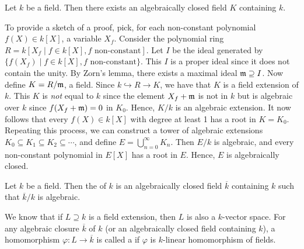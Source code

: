 \begin{theorem}
    Let $k$ be a field. Then there exists an algebraically closed field $K$ containing $k$.
\end{theorem}
To provide a sketch of a proof, pick, for each non-constant polynomial $f(X) \in k[X]$, a variable $X_{f}$. Consider the polynomial ring $R = k[X_{f} \mid f \in k[X], f \text{ non-constant}]$. Let $I$ be the ideal generated by $\{f(X_{f}) \mid f \in k[X], f \text{ non-constant}\}$. This $I$ is a proper ideal since it does not contain the unity. By Zorn's lemma, there exists a maximal ideal $\mathfrak{m} \supseteq I$. Now define $K = R/\mathfrak{m}$, a field. Since $k \hookrightarrow R \to K$, we have that $K$ is a field extension of $k$. This $K$ is \textit{not} equal to $k$ since the element $X_{f} + \mathfrak{m}$ is not in $k$ but is algebraic over $k$ since $f(X_{f} + \mathfrak{m}) = 0$ in $K_{0}$. Hence, $K/k$ is an algebraic extension. It now follows that every $f(X) \in k[X]$ with degree at least 1 has a root in $K = K_{0}$. Repeating this process, we can construct a tower of algebraic extensions $K_{0} \subseteq K_{1} \subseteq K_{2} \subseteq \cdots$, and define $E = \bigcup_{n=0}^{\infty} K_{n}$. Then $E/k$ is algebraic, and every non-constant polynomial in $E[X]$ has a root in $E$. Hence, $E$ is algebraically closed.

\begin{definition}
    Let $k$ be a field. Then the  of $k$ is an algebraically closed field $\overline{k}$ containing $k$ such that $\overline{k}/k$ is algebraic.
\end{definition}

We know that if $L \supseteq k$ is a field extension, then $L$ is also a $k$-vector space. For any algebraic closure $\overline{k}$ of $k$ (or an algebraically closed field containing $k$), a homomorphism $\varphi:L \to \overline{k}$ is called a  if $\varphi$ is $k$-linear homomorphism of fields.

